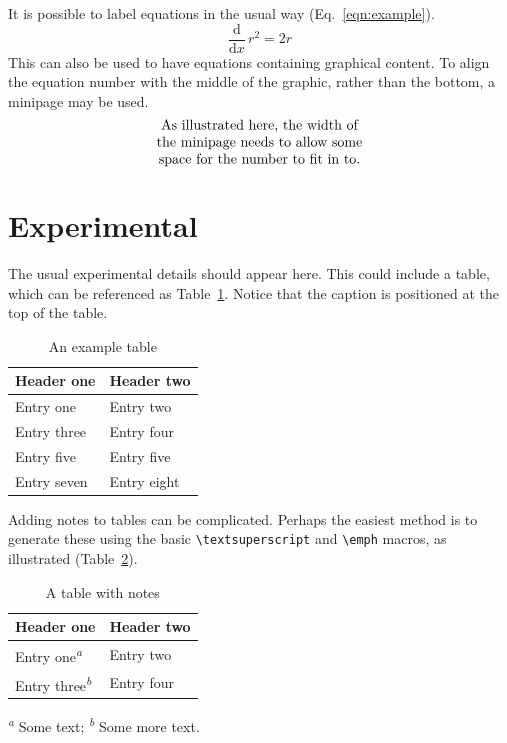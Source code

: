 \documentclass[journal=jacsat,manuscript=article]{achemso}
\begin{document}
It is possible to label equations in the usual way (Eq.~\ref{eqn:example}).
\begin{equation}
  \frac{\mathrm{d}}{\mathrm{d}x} \, r^2 = 2r \label{eqn:example}
\end{equation}
This can also be used to have equations containing graphical
content. To align the equation number with the middle of the graphic,
rather than the bottom, a minipage may be used.
\begin{equation}
  \begin{minipage}[c]{0.80\linewidth}
    \centering
    As illustrated here, the width of \\
    the minipage needs to allow some  \\
    space for the number to fit in to.
  \end{minipage}
  \label{eqn:graphic}
\end{equation}

\section{Experimental}

The usual experimental details should appear here.  This could
include a table, which can be referenced as Table~\ref{tbl:example}.
Notice that the caption is positioned at the top of the table.
\begin{table}
  \caption{An example table}
  \label{tbl:example}
  \begin{tabular}{ll}
    \hline
    Header one  & Header two  \\
    \hline
    Entry one   & Entry two   \\
    Entry three & Entry four  \\
    Entry five  & Entry five  \\
    Entry seven & Entry eight \\
    \hline
  \end{tabular}
\end{table}

Adding notes to tables can be complicated.  Perhaps the easiest
method is to generate these using the basic
\texttt{\textbackslash textsuperscript} and
\texttt{\textbackslash emph} macros, as illustrated (Table~\ref{tbl:notes}).
\begin{table}
  \caption{A table with notes}
  \label{tbl:notes}
  \begin{tabular}{ll}
    \hline
    Header one                            & Header two \\
    \hline
    Entry one\textsuperscript{\emph{a}}   & Entry two  \\
    Entry three\textsuperscript{\emph{b}} & Entry four \\
    \hline
  \end{tabular}

  \textsuperscript{\emph{a}} Some text;
  \textsuperscript{\emph{b}} Some more text.
\end{table}
\end{document}
